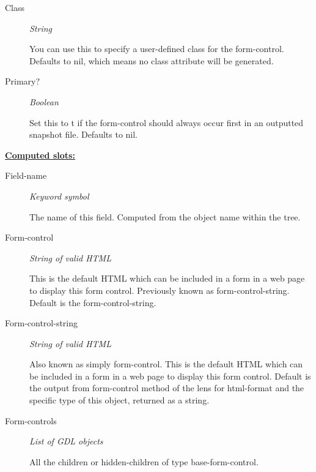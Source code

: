 \documentclass [11pt]{book}
\begin{document}
\begin{itemize}
\begin{description}
\item [Class]
\emph{String}

 You can use this to specify a user-defined class for the form-control. Defaults to nil, which means no class attribute will be generated.




\item [Primary?]
\emph{Boolean}

 Set this to t if the form-control should always occur first in an outputted snapshot file.
Defaults to nil.




\end{description}






\textbf{
\underline{Computed slots:}}

\begin{description}

\item [Field-name]
\emph{Keyword symbol}

 The name of this field. Computed from the object name within the tree.




\item [Form-control]
\emph{String of valid HTML}

 This is the default HTML which can be included in a form in a web page to display this form control.
Previously known as form-control-string. Default is the form-control-string.




\item [Form-control-string]
\emph{String of valid HTML}

 Also known as simply form-control.
This is the default HTML which can be included in a form in a web page to display this form control.
Default is the output from form-control method of the lens for html-format and the
specific type of this object, returned as a string.




\item [Form-controls]
\emph{List of GDL objects}

 All the children or hidden-children
of type base-form-control.





\end{description}
\end{itemize}
\end{document}
